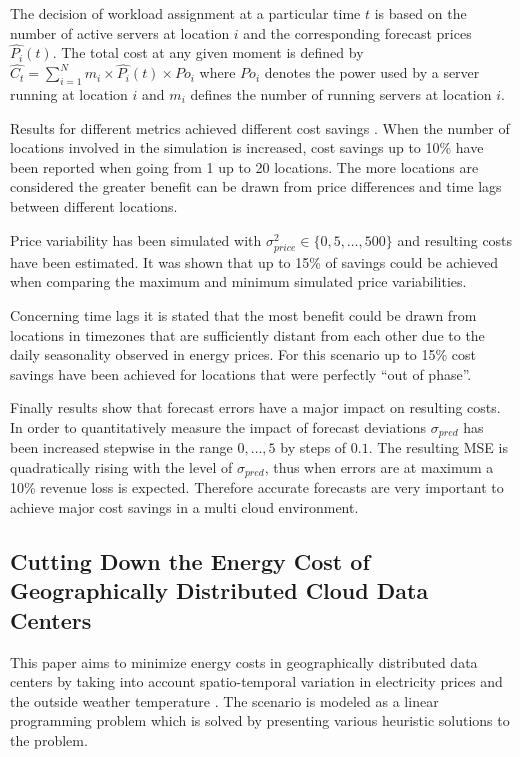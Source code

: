 The decision of workload assignment at a particular time $t$ is based on the number of active servers at location $i$ and the corresponding forecast prices $\hat{P_i}(t)$. The total cost at any given moment is defined by $\hat{C_t} = \sum_{i=1}^{N}{m_i \times \hat{P_i}(t) \times Po_i}$ where $Po_i$ denotes the power used by a server running at location $i$ and $m_i$ defines the number of running servers at location $i$. 

Results for different metrics achieved different cost savings \cite{de2013study}. When the number of locations involved in the simulation is increased, cost savings up to 10\% have been reported when going from 1 up to 20 locations. The more locations are considered the greater benefit can be drawn from price differences and time lags between different locations. 

Price variability has been simulated with $\sigma_{price}^{2} \in \{0,5,\ldots,500\}$ and resulting costs have been estimated. It was shown that up to 15\% of savings could be achieved when comparing the maximum and minimum simulated price variabilities. 

Concerning time lags it is stated that the most benefit could be drawn from locations in timezones that are sufficiently distant from each other due to the daily seasonality observed in energy prices. For this scenario up to 15\% cost savings have been achieved for locations that were perfectly "`out of phase"'. 

Finally results show that forecast errors have a major impact on resulting costs. In order to quantitatively measure the impact of forecast deviations $\sigma_{pred}$ has been increased stepwise in the range $0,\ldots,5$ by steps of $0.1$.
The resulting MSE is quadratically rising with the level of $\sigma_{pred}$, thus when errors are at maximum a 10\% revenue loss is expected. 
Therefore accurate forecasts are very important to achieve major cost savings in a multi cloud environment. 




\subsection{Cutting Down the Energy Cost of Geographically Distributed Cloud Data Centers}

This paper aims to minimize energy costs in geographically distributed data centers by taking into account spatio-temporal variation in electricity prices and the outside weather temperature \cite{guler2013cutting}. The scenario is modeled as a linear programming problem which is solved by presenting various heuristic solutions to the problem. 


